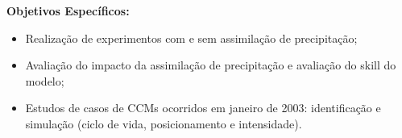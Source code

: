 \textbf{Objetivos Específicos:}

\begin{itemize}
\item Realização de experimentos com e sem assimilação de precipitação;
\item Avaliação do impacto da assimilação de precipitação e avaliação do skill do modelo;
\item Estudos de casos de CCMs ocorridos em janeiro de 2003: identificação e simulação (ciclo de vida, posicionamento e intensidade).
\end{itemize}
